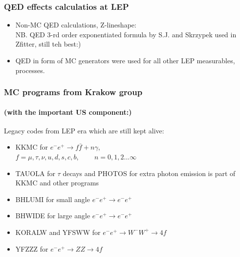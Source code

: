\documentclass{beamer}
\newcommand{\cbl}{\color{blue}}
\newcommand{\ns}{\normalsize}
\begin{document}
\begin{frame}[fragile]
\frametitle{\bf QED effects calculatios at LEP}
\Large\bf
\begin{itemize}
\item
{\cbl Non-MC QED calculations}, Z-lineshape:\\
{\ns 
NB. QED 3-rd order exponentiated formula
by S.J. and Skrzypek used in Zfitter, still teh best:)}
\item
QED in form of {\cbl MC generators}
were used for all other LEP
measurables, processes.
\end{itemize}

\end{frame}









\begin{frame}[fragile]
\frametitle{\bf MC programs from Krakow group}
\framesubtitle{\bf (with the important US component:)}

Legacy codes from LEP era which are still kept alive:

\begin{itemize}
\item
KKMC for $e^-e^+ \to f\bar{f}+ n\gamma$,\\
$f=\mu,\tau,\nu,u,d,s,c,b$,~~~~ $n=0,1,2...\infty$
\item
TAUOLA for $\tau$ decays and PHOTOS for extra photon emission
is part of KKMC and other programs
\item
BHLUMI for small angle $e^-e^+ \to e^-e^+$
\item
BHWIDE for large angle $e^-e^+ \to e^-e^+$
\item
KORALW and YFSWW for $e^-e^+ \to W^-W^+ \to 4f $
\item
YFZZZ for $e^-e^+ \to ZZ \to 4f $
\end{itemize}

\end{frame}
\end{document}
